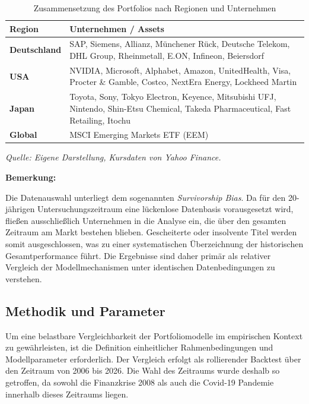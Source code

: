 \documentclass[parskip=half]{scrartcl}
\begin{document}
	\begin{table}[htbp]
		\centering
		\caption{Zusammensetzung des Portfolios nach Regionen und Unternehmen}
		\label{tab:portfolio_names}
		\small %
		\begin{tabularx}{\textwidth}{|l|X|}
			\hline
			\textbf{Region} & \textbf{Unternehmen / Assets} \\ \hline
			\textbf{Deutschland} & SAP, Siemens, Allianz, Münchener Rück, Deutsche Telekom, DHL Group, Rheinmetall, E.ON, Infineon, Beiersdorf \\ \hline
			\textbf{USA} & NVIDIA, Microsoft, Alphabet, Amazon, UnitedHealth, Visa, Procter \& Gamble, Costco, NextEra Energy, Lockheed Martin \\ \hline
			\textbf{Japan} & Toyota, Sony, Tokyo Electron, Keyence, Mitsubishi UFJ, Nintendo, Shin-Etsu Chemical, Takeda Pharmaceutical, Fast Retailing, Itochu \\ \hline
			\textbf{Global} & MSCI Emerging Markets ETF (EEM) \\ \hline
		\end{tabularx}
		\vspace{5pt}
		\par\textit{Quelle: Eigene Darstellung, Kursdaten von Yahoo Finance.}
	\end{table}
	
	\textbf{Bemerkung:}
	
	Die Datenauswahl unterliegt dem sogenannten \textit{Survivorship Bias}. Da für den 20-jährigen Untersuchungszeitraum eine lückenlose Datenbasis vorausgesetzt wird, fließen ausschließlich Unternehmen in die Analyse ein, die über den gesamten Zeitraum am Markt bestehen blieben. Gescheiterte oder insolvente Titel werden somit ausgeschlossen, was zu einer systematischen Überzeichnung der historischen Gesamtperformance führt. Die Ergebnisse sind daher primär als relativer Vergleich der Modellmechanismen unter identischen Datenbedingungen zu verstehen.
	
	\subsection{Methodik und Parameter}
	
	Um eine belastbare Vergleichbarkeit der Portfoliomodelle im empirischen Kontext zu gewährleisten, ist die Definition einheitlicher Rahmenbedingungen und Modellparameter erforderlich. Der Vergleich erfolgt als rollierender Backtest über den Zeitraum von 2006 bis 2026. Die Wahl des Zeitraums wurde deshalb so getroffen, da sowohl die Finanzkrise 2008 als auch die Covid-19 Pandemie innerhalb dieses Zeitraums liegen.
	
\end{document}
